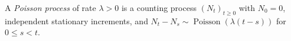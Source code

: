 
A \emph{Poisson process} of rate $\lambda>0$ is a counting process $(N_t)_{t\ge0}$ with $N_0=0$, independent stationary increments, and $N_t-N_s\sim\operatorname{Poisson}(\lambda(t-s))$ for $0\le s<t$.
